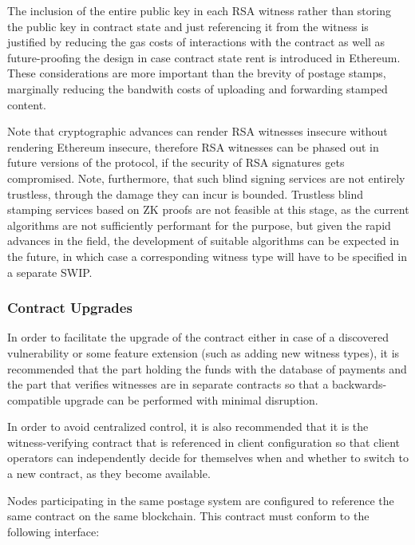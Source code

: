 The inclusion of the entire public key in each RSA witness rather than storing the public key in contract state and just referencing it from the witness is justified by reducing the gas costs of interactions with the contract as well as future-proofing the design in case contract state rent is introduced in Ethereum. These considerations are more important than the brevity of postage stamps, marginally reducing the bandwith costs of uploading and forwarding stamped content.

Note that cryptographic advances can render RSA witnesses insecure without rendering Ethereum insecure, therefore RSA witnesses can be phased out in future versions of the protocol, if the security of RSA signatures gets compromised. Note, furthermore, that such blind signing services are not entirely trustless, through the damage they can incur is bounded. Trustless blind stamping services based on ZK proofs are not feasible at this stage, as the current algorithms are not sufficiently performant for the purpose, but given the rapid advances in the field, the development of suitable algorithms can be expected in the future, in which case a corresponding witness type will have to be specified in a separate SWIP.

\subsubsection{Contract Upgrades}

In order to facilitate the upgrade of the contract either in case of a discovered vulnerability or some feature extension (such as adding new witness types), it is recommended that the part holding the funds with the database of payments and the part that verifies witnesses are in separate contracts so that a backwards-compatible upgrade can be performed with minimal disruption.

In order to avoid centralized control, it is also recommended that it is the witness-verifying contract that is referenced in client configuration so that client operators can independently decide for themselves when and whether to switch to a new contract, as they become available.


Nodes participating in the same postage system are configured to reference the same contract on the same blockchain. This contract must conform to the following interface:

\begin{definition}\label{def:postage}

\end{definition}


